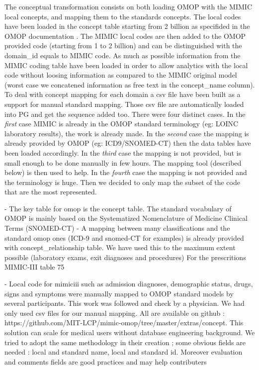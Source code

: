 
The conceptual transformation consists on both loading OMOP with the MIMIC
local concepts, and mapping them to the standards concepts. 
The local codes have been loaded in the concept table starting from 2 billion
as specifided in the OMOP documentation \cite{omop-documentation-pdf}. The
MIMIC local codes are then added to the OMOP provided code (starting from 1 to
2 billion) and can be distinguished with the domain_id equals to MIMIC code. As
much as possible information from the MIMIC coding table have been loaded in
order to allow analytics with the local code without loosing information as
compared to the MIMIC original model (worst case we concatened information as
free text in the concept_name column).
To deal with concept mapping for each domain a csv file have been built as a
support for manual standard mapping. Those csv file are automatically loaded
into PG and get the sequence added too. There were four distinct cases.
In the \emph{first} case MIMIC is already in the OMOP standard terminology (eg:
LOINC laboratory results), the work is already made.
In the \emph{second} case the mapping is already provided by OMOP (eg:
ICD9/SNOMED-CT) then the data tables have been loaded accordingly.  In the
\emph{third} case the mapping is not provided, but is small enough to be done
manually in few hours. The mapping tool (described below) is then used to help.
In the \emph{fourth} case the mapping is not provided and the terminology is
huge. Then we decided to only map the subset of the code that are the most
represented.

- The key table for omop is the concept table. The standard vocabulary of OMOP is mainly based on the Systematized Nomenclature of Medicine Clinical Terms (SNOMED-CT)
- A mapping between many classifications and the standard omop ones (ICD-9 and snomed-CT for examples) is already provided with concept_relationship table. We have used this to the maximum extent possible (laboratory exams, exit diagnoses and procedures)
  For the prescritions MIMIC-III table 75%

- Local code for mimiciii such as admission diagnoses, demographic status, drugs, signs and symptoms were manually mapped to OMOP standard models by several participants. This work was followed and check by a physician. 
We had only used csv files for our manual mapping. All are available on github : https://github.com/MIT-LCP/mimic-omop/tree/master/extras/concept. This solution can scale for medical users without database engineering background. We tried to adopt the same methodology in their creation ; some obvious fields are needed : local and standard name, local and standard id. Moreover evaluation and comments fields are good practices and may help contributers

